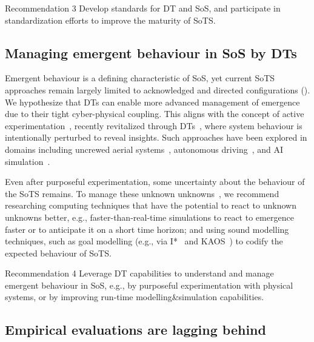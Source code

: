 \begin{recoframe}{Recommendation 3}
Develop standards for DT and SoS, and participate in standardization efforts to improve the maturity of SoTS.
\end{recoframe}


\subsection{Managing emergent behaviour in SoS by DTs}

Emergent behaviour is a defining characteristic of SoS, yet current SoTS approaches remain largely limited to acknowledged and directed configurations (). We hypothesize that DTs can enable more advanced management of emergence due to their tight cyber-physical coupling. This aligns with the concept of active experimentation~\cite{zeigler2018theory}, recently revitalized through DTs~\cite{mittal2023towards,barat2022digital}, where system behaviour is intentionally perturbed to reveal insights. Such approaches have been explored in domains including uncrewed aerial systems~\cite{guo2023intelligent}, autonomous driving~\cite{pun2023neural}, and AI simulation~\cite{liu2024ai}.

Even after purposeful experimentation, some uncertainty about the behaviour of the SoTS remains. To manage these unknown unknowns~\cite{ramasesh2014conceptual}, we recommend researching computing techniques that have the potential to react to unknown unknowns better, e.g., faster-than-real-time simulations to react to emergence faster or to anticipate it on a short time horizon; and using sound modelling techniques, such as goal modelling (e.g., via I*~\cite{goncalves2018systematic} and KAOS~\cite{goncalves2025systematic}) to codify the expected behaviour of SoTS.


\begin{recoframe}{Recommendation 4}
Leverage DT capabilities to understand and manage emergent behaviour in SoS, e.g., by purposeful experimentation with physical systems, or by improving run-time modelling\&simulation capabilities.
\end{recoframe}


\subsection{Empirical evaluations are lagging behind}

